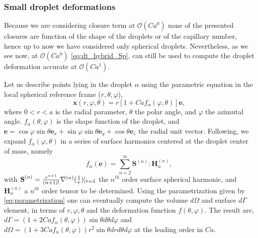 \subsubsection{Small droplet deformations}

Because we are considering closure term at $\mathcal{O}(Ca^0)$ none of the presented closures are function of the shape of the droplets or of the capillary number, hence up to now we have considered only spherical droplets. 
Nevertheless, as we  see now, at $\mathcal{O}(Ca^0)$ \ref{eq:dt_hybrid_Sp}, can still be used to compute the droplet deformation accurate at $\mathcal{O}(Ca^1)$. 

Let us describe points lying in the droplet $\alpha$ using the parametric equation in the local spherical reference frame ($r,\theta,\varphi$),
\begin{equation}
    \textbf{x}(r,\varphi,\theta) = r [1+ Ca f_\alpha(\varphi,\theta)] \textbf{e},
    \label{eq:parametrization}
\end{equation}
where $0<r<a$ is the radial parameter, $\theta$ the polar angle, and $\varphi$ the azimutal angle. 
$f_\alpha(\theta,\varphi)$ is the shape function of the droplet, and $\textbf{e} = \cos\varphi\sin\theta \textbf{e}_x + \sin\varphi\sin\theta\textbf{e}_y+ \cos\theta \textbf{e}_z$ the radial unit vector. 
Following, \citet{nadim1996concise,nadim1991motion} we expand $f_\alpha(\varphi,\theta)$ in a series of surface harmonics centered at the droplet center of mass, namely 
\begin{equation}
    f_\alpha(\textbf{e}) = 
    \sum_{n=2}^\infty\textbf{S}^{(n)}:\textbf{H}_\alpha^{(n)},
    \label{eq:f_definition}
\end{equation} 
with $\textbf{S}^{(n)} = \frac{r^{n+1}}{(n+1)!}\mathbf{\nabla}^{(n)}(\frac{1}{r})|_{r=1}$ the $n^{th}$ order surface spherical harmonic, and $\textbf{H}_\alpha^{(n)}$ a $n^{th}$ order tensor to be determined\citep{nadim1991motion}. 
Using the parametrization given by \ref{eq:parametrization} one can eventually compute the volume $d\Omega$ and surface $d\Gamma$ element, in terms of $r,\varphi,\theta$ and the deformation function $f(\theta,\varphi)$.
The result are, $d\Gamma = (1+2Ca f_\alpha(\theta,\varphi)) \sin\theta d\theta d\varphi$ and $d\Omega = (1+3Ca f_\alpha(\theta,\varphi)) r^2\sin\theta drd\theta d\varphi$ at the leading order in $Ca$. 
